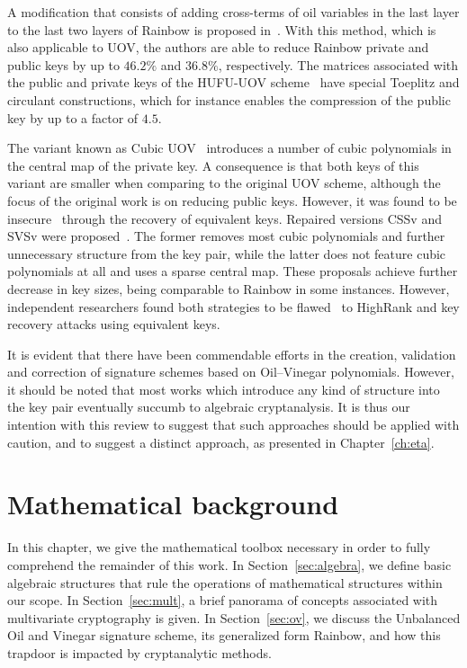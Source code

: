 \documentclass[12pt, a4paper, oneside]{memoir}
\theoremstyle{definition}
\begin{document}
A modification that consists of adding cross-terms of oil variables in the last layer to the last two layers of Rainbow is proposed in~\cite{Tan:201603}. With this method, which is also applicable to UOV, the authors are able to reduce Rainbow private and public keys by up to $46.2\%$ and $36.8\%$, respectively. The matrices associated with the public and private keys of the HUFU-UOV scheme~\cite{Tao:201905} have special Toeplitz and circulant constructions, which for instance enables the compression of the public key by up to a factor of $4.5$.

The variant known as Cubic UOV~\cite{Nie:201511} introduces a number of cubic polynomials in the central map of the private key. A consequence is that both keys of this variant are smaller when comparing to the original UOV scheme, although the focus of the original work is on reducing public keys. However, it was found to be insecure~\cite{Hashimoto:201712} through the recovery of equivalent keys. Repaired versions CSSv and SVSv were proposed~\cite{Duong:201611}. The former removes most cubic polynomials and further unnecessary structure from the key pair, while the latter does not feature cubic polynomials at all and uses a sparse central map. These proposals achieve further decrease in key sizes, being comparable to Rainbow in some instances. However, independent researchers found both strategies to be flawed~\cite{Shim:201711,Hashimoto:201712} to HighRank and key recovery attacks using equivalent keys.

It is evident that there have been commendable efforts in the creation, validation and correction of signature schemes based on Oil--Vinegar polynomials. However, it should be noted that most works which introduce any kind of structure into the key pair eventually succumb to algebraic cryptanalysis. It is thus our intention with this review to suggest that such approaches should be applied with caution, and to suggest a distinct approach, as presented in Chapter~\ref{ch:eta}.

\chapter{Mathematical background}\label{ch:math}

In this chapter, we give the mathematical toolbox necessary in order to fully comprehend the remainder of this work. In Section~\ref{sec:algebra}, we define basic algebraic structures that rule the operations of mathematical structures within our scope. In Section~\ref{sec:mult}, a brief panorama of concepts associated with multivariate cryptography is given. In Section~\ref{sec:ov}, we discuss the Unbalanced Oil and Vinegar signature scheme, its generalized form Rainbow, and how this trapdoor is impacted by cryptanalytic methods.
\end{document}
